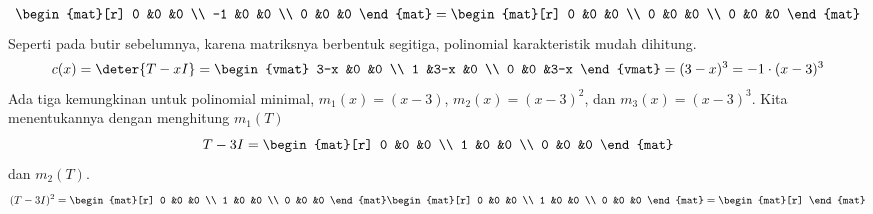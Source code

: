 \begin{exercises}
\begin{answer}
\begin{exparts}
\begin{multline*}
           \begin{mat}[r]
              0  &0  &0  \\
             -1  &0  &0  \\
              0  &0  &0
           \end{mat}
           =
           \begin{mat}[r]
             0  &0  &0  \\
             0  &0  &0  \\
             0  &0  &0
           \end{mat}
         \end{multline*}
       \partsitem Seperti pada butir sebelumnya, karena matriksnya berbentuk
        segitiga, polinomial karakteristik mudah dihitung.
        \begin{equation*}
          c(x)=\deter{T-xI}
              =
              \begin{vmat}
                3-x  &0   &0   \\
                1    &3-x &0   \\
                0    &0   &3-x
              \end{vmat}
              =(3-x)^3=-1\cdot (x-3)^3
        \end{equation*}
        Ada tiga kemungkinan untuk polinomial minimal,
        $m_1(x)=(x-3)$, $m_2(x)=(x-3)^2$, dan $m_3(x)=(x-3)^3$.
        Kita menentukannya dengan menghitung $m_1(T)$
        \begin{equation*}
          T-3I=
          \begin{mat}[r]
            0  &0  &0  \\
            1  &0  &0  \\
            0  &0  &0
          \end{mat}
        \end{equation*}
        dan $m_2(T)$.
        \begin{equation*}
          (T-3I)^2=
          \begin{mat}[r]
            0  &0  &0  \\
            1  &0  &0  \\
            0  &0  &0
          \end{mat}
          \begin{mat}[r]
            0  &0  &0  \\
            1  &0  &0  \\
            0  &0  &0
          \end{mat}
          =          
          \begin{mat}[r]

\end{mat}
\end{equation*}
\end{exparts}
\end{answer}
\end{exercises}
